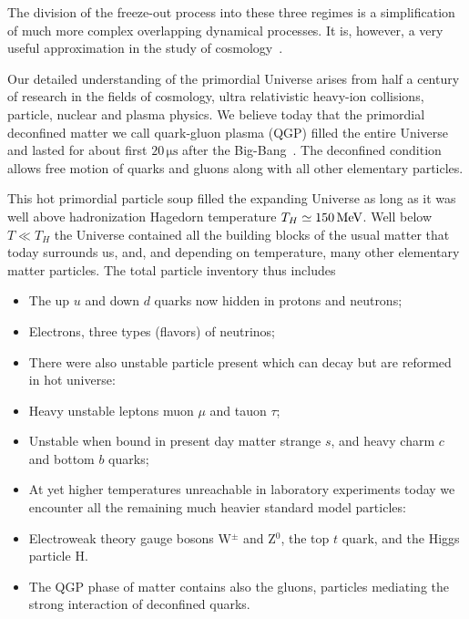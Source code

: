The division of the freeze-out process into these three regimes is a simplification of much more complex overlapping dynamical processes. It is, however, a very useful approximation in the study of cosmology~\cite{Mangano:2005cc,Rafelski:2023emw,Birrell:2014gea,Birrell:2012gg}.

Our detailed understanding of the primordial Universe arises from half a century of research in the fields of cosmology, ultra relativistic heavy-ion collisions, particle, nuclear and plasma physics. We believe today that the primordial deconfined matter we call quark-gluon plasma (QGP) filled the entire Universe and lasted for about first $20\,\mathrm{\mu s}$ after the Big-Bang~. The deconfined condition allows free motion of quarks and gluons along with all other elementary particles. 

This hot primordial particle soup filled the expanding Universe as long as it was well above hadronization Hagedorn temperature $T_H\simeq 150\text{\,MeV}$. Well below $T\ll T_H$ the Universe contained all the building blocks of the usual matter that today surrounds us, and, and depending on temperature, many other elementary matter particles. The total particle inventory thus includes
\begin{itemize}
\item The up $u$ and down $d$ quarks now hidden in protons and neutrons;
\item Electrons, three types (flavors) of neutrinos;
\item[] There were also unstable particle present which can decay but are reformed in hot universe:
\item Heavy unstable leptons muon $\mu$ and tauon $\tau$;
\item Unstable when bound in present day matter strange $s$, and heavy charm $c$ and bottom $b$ quarks;
\item[] At yet higher temperatures unreachable in laboratory experiments today we encounter all the remaining much heavier standard model particles: 
\item Electroweak theory gauge bosons W$^\pm$ and Z$^0$, the top $t$ quark, and the Higgs particle H.
\item The QGP phase of matter contains also the gluons, particles mediating the strong interaction of deconfined quarks.
\end{itemize}

